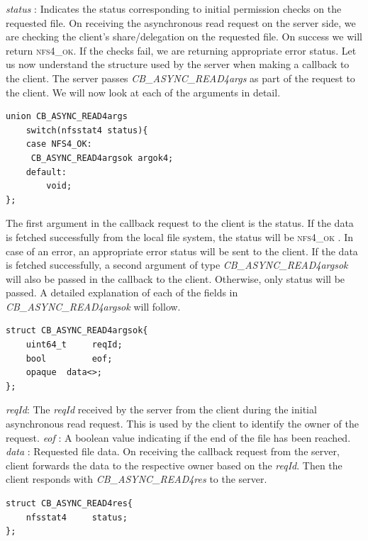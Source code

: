\textit{status} : Indicates the status corresponding to initial permission checks on the requested file.
On receiving the asynchronous read request on the server side, we are checking the client's share/delegation on the requested file. On success we will return \textsc{nfs4\_ok}.  If the checks fail, we are returning appropriate error status.
\hfill \break \newline
\noindent Let us now understand the structure used by the server when making a callback to the client. The server passes \textit{CB\_ASYNC\_READ4args} as part of the request to the client. We will now look at each of the arguments in detail. 
\begin{lstlisting}
union CB_ASYNC_READ4args 
	switch(nfsstat4 status){
	case NFS4_OK:
	 CB_ASYNC_READ4argsok argok4;
 	default:
		void;
};
\end{lstlisting}

\noindent The first argument in the callback request to the client is the status. If the data is fetched successfully from the local file system, the status will be \textsc{nfs4\_ok} . In case of an error, an appropriate error status will be sent to the client. If the data is fetched successfully, a second argument of type \textit{CB\_ASYNC\_READ4argsok} will also be passed in the callback to the client. Otherwise, only status will be passed. A detailed explanation of each of the fields in \textit{CB\_ASYNC\_READ4argsok} will follow.

\begin{lstlisting}
struct CB_ASYNC_READ4argsok{
	uint64_t	 reqId;
	bool		 eof;
	opaque	data<>;
};
\end{lstlisting}

\noindent\textit{reqId}: The \textit{reqId} received by the server from the client during the initial asynchronous read request. This is used by the client to identify the owner of the request.
\hfill \break \newline
\noindent\textit{eof} : A boolean value indicating if the end of the file has been reached.
\hfill \break \newline
\noindent\textit{data} : Requested file data.
\hfill \break \newline
\noindent On receiving the callback request from the server, client forwards the data to the respective owner based on the \textit{reqId}. Then the client responds with \textit{CB\_ASYNC\_READ4res} to the server.
 
\begin{lstlisting}
struct CB_ASYNC_READ4res{
	nfsstat4	 status;
};
\end{lstlisting}

